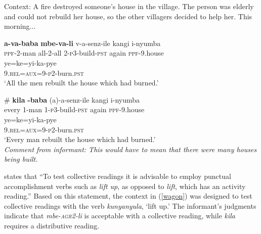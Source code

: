 \documentclass[letterpaper, 12pt]{article}
\begin{document}
\begin{exe}

 \ex Context: A fire destroyed someone's house in the village. The person was elderly and could not rebuild her house, so the other villagers decided to help her. This morning...  \\

\begin{xlist}

\ex \gll \textbf{a-va-baba} \textbf{mbe-va-li} v-a-senz-ile kangi i-nyumba \\
\textsc{ppf}-2-man all-2-all 2-\textsc{p3}-build-\textsc{pst} again \textsc{ppf}-9.house\\

\gll ye=ke=yi-ka-pye  \\ 
 9.\textsc{rel}=\textsc{aux}=9-\textsc{p2}-burn.\textsc{pst} \\
`All the men rebuilt the house which had burned.' \\

\vspace{5mm}

\ex \gll \# \textbf{kila} \textbf{-baba} (a)-a-senz-ile kangi i-nyumba \\
{} every 1-man 1-\textsc{p3}-build-\textsc{pst} again \textsc{ppf}-9.house \\

\gll ye=ke=yi-ka-pye   \\ 
9.\textsc{rel}=\textsc{aux}=9-\textsc{p2}-burn.\textsc{pst}\\
`Every man rebuilt the house which had burned.' \\ 
\textit{Comment from informant: This would have to mean that there were many houses being built.}

\end{xlist}
\end{exe}


 states that ``To test collective readings it is advisable to employ punctual accomplishment verbs such as \textit{lift up}, as opposed to \emph{lift}, which has an activity reading.'' Based on this statement, the context in (\ref{wagon}) was designed to test collective readings with the verb \textit{kunyanyula}, `lift up.' The informant's judgments indicate that  \textit{mbe-\textsc{agr2}-li} is acceptable with a collective reading, while \textit{kila} requires a distributive reading. 
\end{document}
